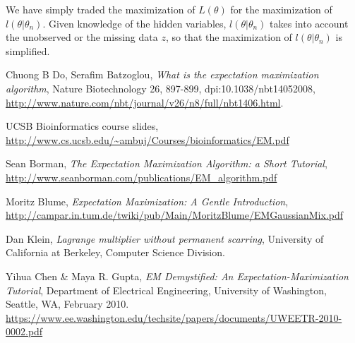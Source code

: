 \documentclass{article}  %
\begin{document}
We have simply traded the maximization of $L(\theta)$ for the maximization of $l(\theta|\theta_n)$. Given knowledge of the hidden variables, $l(\theta|\theta_n)$ takes into account the unobserved or the missing data $z$, so that the maximization of $l(\theta|\theta_n)$ is simplified. 

\begin{thebibliography}{9}

 Chuong B Do,  Serafim Batzoglou, \emph{What is the expectation maximization algorithm}, Nature Biotechnology 26, 897-899, dpi:10.1038/nbt14052008, \url{http://www.nature.com/nbt/journal/v26/n8/full/nbt1406.html}.

 UCSB Bioinformatics course slides, \url{http://www.cs.ucsb.edu/~ambuj/Courses/bioinformatics/EM.pdf}

 Sean Borman, \emph{The Expectation Maximization Algorithm: a Short Tutorial}, \url{http://www.seanborman.com/publications/EM_algorithm.pdf}

 Moritz Blume, \emph{Expectation Maximization: A Gentle
Introduction},
\url{http://campar.in.tum.de/twiki/pub/Main/MoritzBlume/EMGaussianMix.pdf}

 Dan Klein, \emph{Lagrange multiplier without permanent
scarring}, University of California at Berkeley, Computer Science Division.

 Yihua Chen \& Maya R. Gupta, \emph{EM Demystified: An
Expectation-Maximization Tutorial}, Department of Electrical Engineering,
University of Washington, Seattle, WA, February 2010. \url{https://www.ee.washington.edu/techsite/papers/documents/UWEETR-2010-0002.pdf}

\end{thebibliography}
\end{document}
